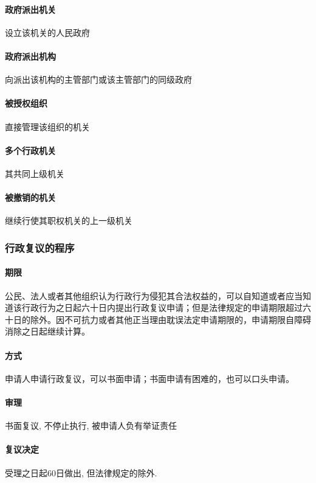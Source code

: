 \paragraph{政府派出机关} 设立该机关的人民政府

\paragraph{政府派出机构} 向派出该机构的主管部门或该主管部门的同级政府

\paragraph{被授权组织} 直接管理该组织的机关

\paragraph{多个行政机关} 其共同上级机关

\paragraph{被撤销的机关} 继续行使其职权机关的上一级机关

\subsubsection{行政复议的程序}

\paragraph{期限} 公民、法人或者其他组织认为行政行为侵犯其合法权益的，可以自知道或者应当知道该行政行为之日起六十日内提出行政复议申请；但是法律规定的申请期限超过六十日的除外。因不可抗力或者其他正当理由耽误法定申请期限的，申请期限自障碍消除之日起继续计算。

\paragraph{方式} 申请人申请行政复议，可以书面申请；书面申请有困难的，也可以口头申请。

\paragraph{审理} 书面复议, 不停止执行, 被申请人负有举证责任

\paragraph{复议决定} 受理之日起60日做出, 但法律规定的除外.

